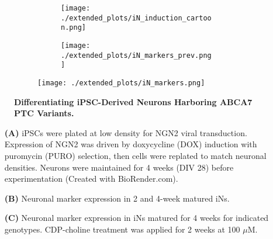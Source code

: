 \begin{figure}[H]
    \begin{subfigure}[t]{\textwidth}
        \begin{subfigure}[t]{0.45\textwidth}
            \caption{}
            \texttt{[image: ./extended\_plots/iN\_induction\_cartoon.png]}        
        \end{subfigure}
        \begin{subfigure}[t]{0.45\textwidth}
            \caption{}
            \texttt{[image: ./extended\_plots/iN\_markers\_prev.png]}        
        \end{subfigure}
    \end{subfigure}
    \begin{subfigure}[t]{0.8\textwidth}
        \caption{}
        \hspace{2cm}
        \texttt{[image: ./extended\_plots/iN\_markers.png]}        
    \end{subfigure}
    \caption{
        \textbf{Differentiating iPSC-Derived Neurons Harboring ABCA7 PTC Variants.}\\
    }
    \label{fig:iN_markers}
\end{figure}
\begin{itemize}
    \item[\textbf{(A)}] iPSCs were plated at low density for NGN2 viral transduction. Expression of NGN2 was driven by doxycycline (DOX) induction with puromycin (PURO) selection, then cells were replated to match neuronal densities. Neurons were maintained for 4 weeks (DIV 28) before experimentation (Created with BioRender.com). 
    \item[\textbf{(B)}] Neuronal marker expression in 2 and 4-week matured iNs. 
    \item[\textbf{(C)}] Neuronal marker expression in iNs matured for 4 weeks for indicated genotypes. CDP-choline treatment was applied for 2 weeks at 100 $\mu$M.
\end{itemize}